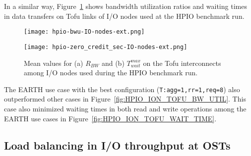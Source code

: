 \documentclass{jhps}
\begin{document}
In a similar way, Figure~\ref{fig:HPIO_ION_TOFU_BWU_WAIT_TIME} shows
bandwidth utilization ratios and waiting times in data transfers
on Tofu links of I/O nodes used at the HPIO benchmark run.
%
\begin{figure}[tb]
\centering
\begin{minipage}[t]{0.48\textwidth}
 \centering
 \texttt{[image: hpio-bwu-IO-nodes-ext.png]}
 \label{fig:HPIO_ION_TOFU_BW_UTIL}
\end{minipage}
%
\noindent
\begin{minipage}[t]{0.48\textwidth}
 \centering
 \texttt{[image: hpio-zero\_credit\_sec-IO-nodes-ext.png]}
 \label{fig:HPIO_ION_TOFU_WAIT_TIME}
\end{minipage}
\caption{Mean values for (a) $R_{BW}$ and (b) $T_{wait}^{max}$ on the Tofu interconnects
among I/O nodes used during the HPIO benchmark run.}
\label{fig:HPIO_ION_TOFU_BWU_WAIT_TIME}
\end{figure}
%
The EARTH use case with the best configuration ({\tt T:agg=1,rr=1,req=8}) also
outperformed other cases in
Figure~\ref{fig:HPIO_ION_TOFU_BW_UTIL}.
This case also minimized waiting times in both read and write operations
among the EARTH use cases in Figure~\ref{fig:HPIO_ION_TOFU_WAIT_TIME}.

\subsection{Load balancing in I/O throughput at OSTs}
\end{document}

